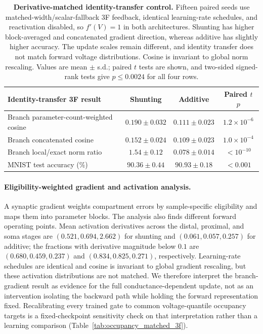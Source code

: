     \begin{table}[htbp]
    \centering
    \small
    \begin{tabular}{@{}lccc@{}}
    \toprule
    \textbf{Identity-transfer 3F result} & \textbf{Shunting} & \textbf{Additive} & \textbf{Paired $t$ $p$} \\
    \midrule
    Branch parameter-count-weighted cosine & $0.190\pm0.032$ & $0.111\pm0.023$ & $1.2{\times}10^{-6}$ \\
    Branch concatenated cosine & $0.152\pm0.024$ & $0.109\pm0.023$ & $1.0{\times}10^{-4}$ \\
    Branch local/exact norm ratio & $1.54\pm0.12$ & $0.078\pm0.014$ & $<10^{-10}$ \\
    MNIST test accuracy (\%) & $90.36\pm0.44$ & $90.93\pm0.18$ & $<0.001$ \\
    \bottomrule
    \end{tabular}
    \caption{\textbf{Derivative-matched identity-transfer control.} Fifteen paired seeds use matched-width/scalar-fallback 3F feedback, identical learning-rate schedules, and reactivation disabled, so $f'(V)=1$ in both architectures. Shunting has higher block-averaged and concatenated gradient direction, whereas additive has slightly higher accuracy. The update scales remain different, and identity transfer does not match forward voltage distributions. Cosine is invariant to global norm rescaling. Values are mean $\pm$ s.d.; paired $t$ tests are shown, and two-sided signed-rank tests give $p\leq0.0024$ for all four rows.}
    \label{tab:identity_transfer_3f}
    \end{table}

    \paragraph{Eligibility-weighted gradient and activation analysis.}
    A synaptic gradient weights compartment errors by sample-specific eligibility and maps them into parameter blocks. The analysis also finds different forward operating points. Mean activation derivatives across the distal, proximal, and soma stages are $(0.521,0.694,2.662)$ for shunting and $(0.061,0.057,0.257)$ for additive; the fractions with derivative magnitude below $0.1$ are $(0.680,0.459,0.237)$ and $(0.834,0.825,0.271)$, respectively. Learning-rate schedules are identical and cosine is invariant to global gradient rescaling, but these activation distributions are not matched. We therefore interpret the branch-gradient result as evidence for the full conductance-dependent update, not as an intervention isolating the backward path while holding the forward representation fixed. Recalibrating every trained gate to common voltage-quantile occupancy targets is a fixed-checkpoint sensitivity check on that interpretation rather than a learning comparison (Table~\ref{tab:occupancy_matched_3f}).

